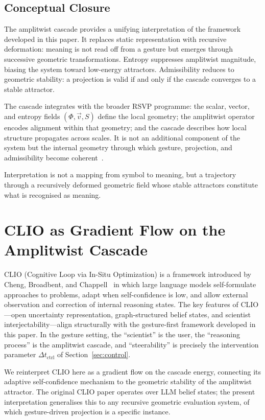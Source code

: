 \documentclass[11pt, a4paper]{article}
\begin{document}
\subsection{Conceptual Closure}

The amplitwist cascade provides a unifying interpretation of the
framework developed in this paper. It replaces static representation
with recursive deformation: meaning is not read off from a gesture but
emerges through successive geometric transformations. Entropy suppresses
amplitwist magnitude, biasing the system toward low-energy attractors.
Admissibility reduces to geometric stability: a projection is valid if
and only if the cascade converges to a stable attractor.

The cascade integrates with the broader RSVP programme: the scalar,
vector, and entropy fields $(\Phi, \vec{v}, S)$ define the local
geometry; the amplitwist operator encodes alignment within that geometry;
and the cascade describes how local structure propagates across scales.
It is not an additional component of the system but the internal
geometry through which gesture, projection, and admissibility become
coherent~\cite{juarrero1999,needham1997,cox2016}.

Interpretation is not a mapping from symbol to meaning, but a trajectory
through a recursively deformed geometric field whose stable attractors
constitute what is recognised as meaning.

\section{CLIO as Gradient Flow on the Amplitwist Cascade}

CLIO (Cognitive Loop via In-Situ Optimization) is a framework introduced
by Cheng, Broadbent, and Chappell~\cite{cheng2025clio} in which large
language models self-formulate approaches to problems, adapt when
self-confidence is low, and allow external observation and correction of
internal reasoning states. The key features of CLIO---open uncertainty
representation, graph-structured belief states, and scientist
interjectability---align structurally with the gesture-first framework
developed in this paper. In the gesture setting, the ``scientist'' is
the user, the ``reasoning process'' is the amplitwist cascade, and
``steerability'' is precisely the intervention parameter
$\Delta t_{\mathrm{ctrl}}$ of Section~\ref{sec:control}.

We reinterpret CLIO here as a gradient flow on the cascade energy,
connecting its adaptive self-confidence mechanism to the geometric
stability of the amplitwist attractor. The original CLIO paper operates
over LLM belief states; the present interpretation generalises this to
any recursive geometric evaluation system, of which gesture-driven
projection is a specific instance.
\end{document}
